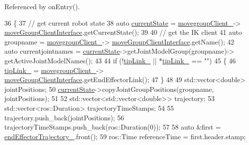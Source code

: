 Referenced by on\+Entry().


\begin{DoxyCode}
36     \{
37         \textcolor{comment}{// get current robot state}
38         \textcolor{keyword}{auto} \hyperlink{classsmacc_1_1ISmaccClientBehavior_a5a6658a2deb72b700ae595e594617616}{currentState} = \hyperlink{classcl__move__group__interface_1_1CbMoveEndEffectorTrajectory_aea650d3e7836125b32be97392b71a7f3}{movegroupClient\_}->
      \hyperlink{classcl__move__group__interface_1_1ClMoveGroup_a92922ea689e4e1b7b91512c56629c95b}{moveGroupClientInterface}.getCurrentState();
39 
40         \textcolor{comment}{// get the IK client}
41         \textcolor{keyword}{auto} groupname = \hyperlink{classcl__move__group__interface_1_1CbMoveEndEffectorTrajectory_aea650d3e7836125b32be97392b71a7f3}{movegroupClient\_}->
      \hyperlink{classcl__move__group__interface_1_1ClMoveGroup_a92922ea689e4e1b7b91512c56629c95b}{moveGroupClientInterface}.getName();
42         \textcolor{keyword}{auto} currentjointnames = \hyperlink{classsmacc_1_1ISmaccClientBehavior_a5a6658a2deb72b700ae595e594617616}{currentState}->getJointModelGroup(groupname)->
      getActiveJointModelNames();
43 
44         \textcolor{keywordflow}{if} (!\hyperlink{classcl__move__group__interface_1_1CbMoveEndEffectorTrajectory_a24c6c30b9b0761a61fa002d947bd3e11}{tipLink\_} || *\hyperlink{classcl__move__group__interface_1_1CbMoveEndEffectorTrajectory_a24c6c30b9b0761a61fa002d947bd3e11}{tipLink\_} == \textcolor{stringliteral}{""})
45         \{
46             \hyperlink{classcl__move__group__interface_1_1CbMoveEndEffectorTrajectory_a24c6c30b9b0761a61fa002d947bd3e11}{tipLink\_} = \hyperlink{classcl__move__group__interface_1_1CbMoveEndEffectorTrajectory_aea650d3e7836125b32be97392b71a7f3}{movegroupClient\_}->
      \hyperlink{classcl__move__group__interface_1_1ClMoveGroup_a92922ea689e4e1b7b91512c56629c95b}{moveGroupClientInterface}.getEndEffectorLink();
47         \}
48 
49         std::vector<double> jointPositions;
50         \hyperlink{classsmacc_1_1ISmaccClientBehavior_a5a6658a2deb72b700ae595e594617616}{currentState}->copyJointGroupPositions(groupname, jointPositions);
51 
52         std::vector<std::vector<double>> trajectory;
53         std::vector<ros::Duration> trajectoryTimeStamps;
54 
55         trajectory.push\_back(jointPositions);
56         trajectoryTimeStamps.push\_back(ros::Duration(0));
57 
58         \textcolor{keyword}{auto} &first = \hyperlink{classcl__move__group__interface_1_1CbMoveEndEffectorTrajectory_ae13dfd31ea3660646e03882f0c2c29f0}{endEffectorTrajectory\_}.front();
59         ros::Time referenceTime = first.header.stamp;

\end{DoxyCode}
